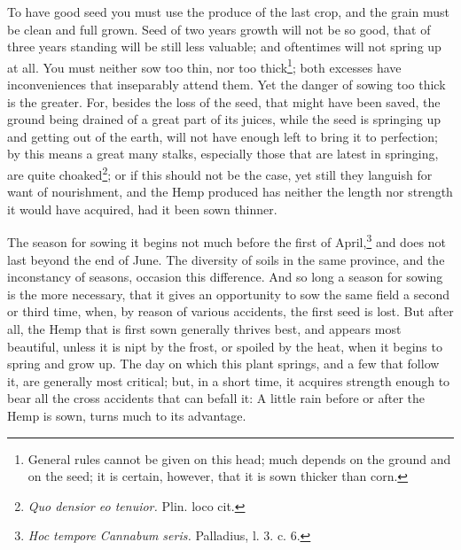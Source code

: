 \documentclass[a4paper, 11pt, oneside, polutonikogreek, english]{article}
\begin{document}
To have good seed you must use the produce of the last crop, and the grain must be clean and full grown. Seed of two years growth will not be so good, that of three years standing will be still less valuable; and oftentimes will not spring up at all. You must neither sow too thin, nor too thick\footnote{General rules cannot be given on this head; much depends on the ground and on the seed; it is certain, however, that it is sown thicker than corn.}; both excesses have inconveniences that inseparably attend them. Yet the danger of sowing too thick is the greater. For, besides the loss of the seed, that might have been saved, the ground being drained of a great part of its juices, while the seed is springing up and getting out of the earth, will not have enough left to bring it to perfection; by this means a great many stalks, especially those that are latest in springing, are quite choaked\footnote{\emph{Quo densior eo tenuior.} Plin. loco cit.}; or if this should not be the case, yet still they languish for want of nourishment, and the Hemp produced has neither the length nor strength it would have acquired, had it been sown thinner.

The season for sowing it begins not much before the first of April,\footnote{\emph{Hoc tempore Cannabum seris.} Palladius, l. 3. c. 6.} and does not last beyond the end of June. The diversity of soils in the same province, and the inconstancy of seasons, occasion this difference. And so long a season for sowing is the more necessary, that it gives an opportunity to sow the same field a second or third time, when, by reason of various accidents, the first seed is lost. But after all, the Hemp that is first sown generally thrives best, and appears most beautiful, unless it is nipt by the frost, or spoiled by the heat, when it begins to spring and grow up. The day on which this plant springs, and a few that follow it, are generally most critical; but, in a short time, it acquires strength enough to bear all the cross accidents that can befall it: A little rain before or after the Hemp is sown, turns much to its advantage.
\end{document}
